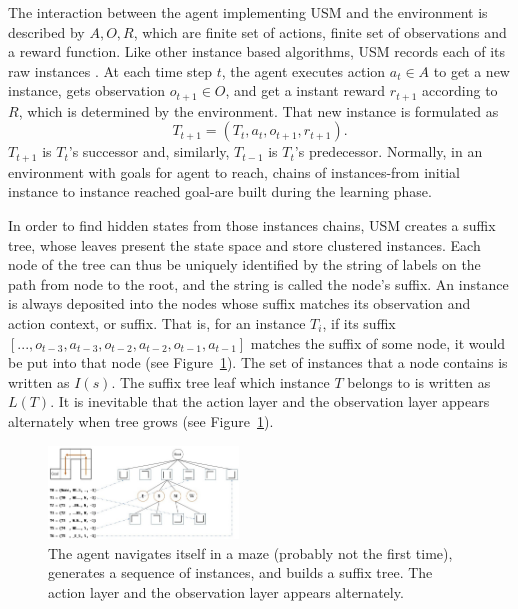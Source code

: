 \documentclass{article}
\begin{document}
The interaction between the agent implementing USM and the environment is described by
$A, O, R$, which are finite set of actions, finite set of observations and a reward function.
Like other instance based algorithms, USM records each of its raw instances
\cite{mccallum1995instance}. At each time step $t$, the agent executes action
$a_t \in A$ to get a new instance, gets observation $o_{t+1} \in O$, and get a
instant reward $r_{t+1}$ according to $R$, which is determined by the environment.
That new instance is formulated as
\begin{equation}
  T_{t+1}= (T_t, a_t, o_{t+1}, r_{t+1}). \label{equ:instance}
\end{equation}
$T_{t+1}$ is $T_t$'s successor and, similarly, $T_{t-1}$ is $T_t$'s predecessor.
Normally, in an environment with goals for agent to reach, chains of instances-from
initial instance to instance reached goal-are built during the learning phase.

In order to find hidden states from those instances chains, USM creates a suffix tree,
whose leaves present the state space and store clustered instances. Each node of the tree
can thus be uniquely identified by the string of labels on the path from node to the root,
and the string is called the node’s suffix. An instance is always deposited into the
nodes whose suffix matches its observation and action context, or suffix. That is,
for an instance $T_i$, if its suffix $[..., o_{t-3}, a_{t-3}, o_{t-2}, a_{t-2}, o_{t-1}, a_{t-1}]$
matches the suffix of some node, it would be put into that node (see Figure~\ref{fig:suffix tree}).
The set of instances that a node contains is written as $I(s)$. The suffix tree leaf which
instance $T$ belongs to is written as $L(T)$. It is inevitable that the action layer and
the observation layer appears alternately when tree grows (see Figure~\ref{fig:suffix tree}).

\begin{figure}[h]
  \centering
    \includegraphics[width=0.45\textwidth]{usm_sample.jpg}
  \caption{The agent navigates itself in a maze (probably not the first time), generates
  a sequence of instances, and builds a suffix tree. The action layer and
  the observation layer appears alternately.}
  \label{fig:suffix tree}
\end{figure}
\end{document}
